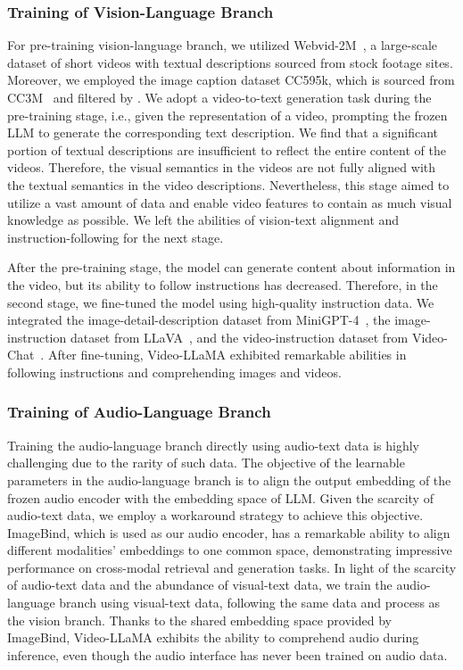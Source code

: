 \documentclass[11pt]{article}
\begin{document}
\subsubsection{Training of Vision-Language Branch}
For pre-training vision-language branch, we utilized Webvid-2M~\citep{Bain21}, a large-scale dataset of short videos with textual descriptions sourced from stock footage sites. Moreover, we employed the image caption dataset CC595k, which is sourced from CC3M~\citep{sharma-etal-2018-conceptual} and filtered by \citet{liu2023visualit}. We adopt a video-to-text generation task during the pre-training stage, i.e., given the representation of a video, prompting the frozen LLM to generate the corresponding text description. We find that a significant portion of textual descriptions are insufficient to reflect the entire content of the videos. Therefore, the visual semantics in the videos are not fully aligned with the textual semantics in the video descriptions. Nevertheless, this stage aimed to utilize a vast amount of data and enable video features to contain as much visual knowledge as possible. We left the abilities of vision-text alignment and instruction-following for the next stage.

After the  pre-training stage, the model can generate content about information in the video, but its ability to follow instructions has decreased. Therefore, in the second stage, we fine-tuned the model using high-quality instruction data. We integrated the image-detail-description dataset from MiniGPT-4~\citep{zhu2023minigpt}, the image-instruction dataset from LLaVA~\citep{liu2023visualit}, and the video-instruction dataset from Video-Chat~\citep{li2023videochatcv}. After fine-tuning, Video-LLaMA exhibited remarkable abilities in following instructions and comprehending images and videos. 

\subsubsection{Training of Audio-Language Branch}
Training the audio-language branch directly using audio-text data is highly challenging due to the rarity of such data.  The objective of the learnable parameters in the audio-language branch is to align the output embedding of the frozen audio encoder with the embedding space of LLM. Given the scarcity of audio-text data, we employ a workaround strategy to achieve this objective.
ImageBind, which is used as our audio encoder, has a remarkable ability to align different modalities' embeddings to one common space, demonstrating impressive performance on cross-modal retrieval and generation tasks. 
In light of the scarcity of audio-text data and the abundance of visual-text data, we train the audio-language branch using visual-text data, following the same data and process as the vision branch.  Thanks to the shared embedding space provided by ImageBind, Video-LLaMA exhibits the ability to comprehend audio during inference, even though the audio interface has never been trained on audio data.
\end{document}
